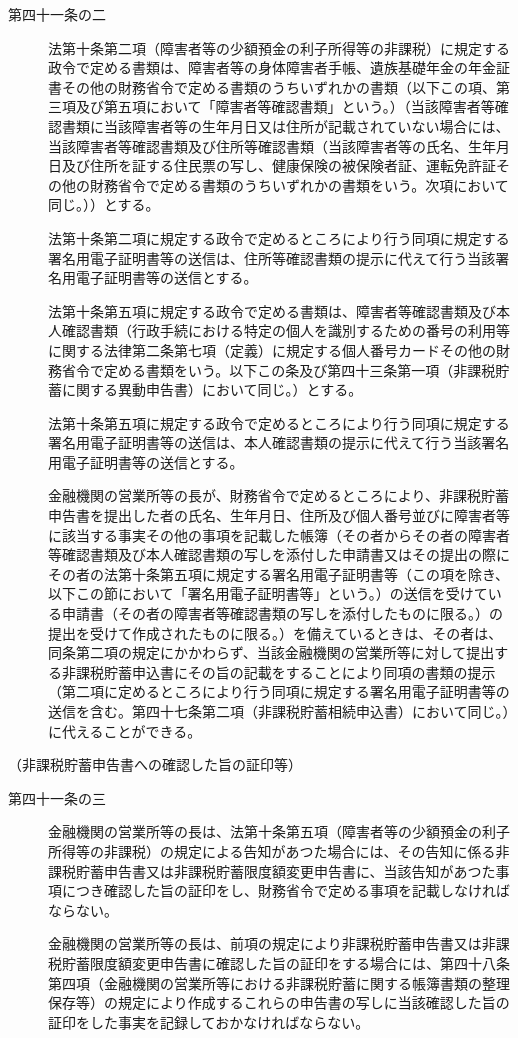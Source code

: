 \documentclass[twocolumn,a4j,10pt]{ltjtarticle}
\begin{document}
\begin{description}
\item[第四十一条の二]法第十条第二項（障害者等の少額預金の利子所得等の非課税）に規定する政令で定める書類は、障害者等の身体障害者手帳、遺族基礎年金の年金証書その他の財務省令で定める書類のうちいずれかの書類（以下この項、第三項及び第五項において「障害者等確認書類」という。）（当該障害者等確認書類に当該障害者等の生年月日又は住所が記載されていない場合には、当該障害者等確認書類及び住所等確認書類（当該障害者等の氏名、生年月日及び住所を証する住民票の写し、健康保険の被保険者証、運転免許証その他の財務省令で定める書類のうちいずれかの書類をいう。次項において同じ。））とする。
\item[]法第十条第二項に規定する政令で定めるところにより行う同項に規定する署名用電子証明書等の送信は、住所等確認書類の提示に代えて行う当該署名用電子証明書等の送信とする。
\item[]法第十条第五項に規定する政令で定める書類は、障害者等確認書類及び本人確認書類（行政手続における特定の個人を識別するための番号の利用等に関する法律第二条第七項（定義）に規定する個人番号カードその他の財務省令で定める書類をいう。以下この条及び第四十三条第一項（非課税貯蓄に関する異動申告書）において同じ。）とする。
\item[]法第十条第五項に規定する政令で定めるところにより行う同項に規定する署名用電子証明書等の送信は、本人確認書類の提示に代えて行う当該署名用電子証明書等の送信とする。
\item[]金融機関の営業所等の長が、財務省令で定めるところにより、非課税貯蓄申告書を提出した者の氏名、生年月日、住所及び個人番号並びに障害者等に該当する事実その他の事項を記載した帳簿（その者からその者の障害者等確認書類及び本人確認書類の写しを添付した申請書又はその提出の際にその者の法第十条第五項に規定する署名用電子証明書等（この項を除き、以下この節において「署名用電子証明書等」という。）の送信を受けている申請書（その者の障害者等確認書類の写しを添付したものに限る。）の提出を受けて作成されたものに限る。）を備えているときは、その者は、同条第二項の規定にかかわらず、当該金融機関の営業所等に対して提出する非課税貯蓄申込書にその旨の記載をすることにより同項の書類の提示（第二項に定めるところにより行う同項に規定する署名用電子証明書等の送信を含む。第四十七条第二項（非課税貯蓄相続申込書）において同じ。）に代えることができる。
\end{description}
\noindent\hspace{10pt}（非課税貯蓄申告書への確認した旨の証印等）
\begin{description}
\item[第四十一条の三]金融機関の営業所等の長は、法第十条第五項（障害者等の少額預金の利子所得等の非課税）の規定による告知があつた場合には、その告知に係る非課税貯蓄申告書又は非課税貯蓄限度額変更申告書に、当該告知があつた事項につき確認した旨の証印をし、財務省令で定める事項を記載しなければならない。
\item[]金融機関の営業所等の長は、前項の規定により非課税貯蓄申告書又は非課税貯蓄限度額変更申告書に確認した旨の証印をする場合には、第四十八条第四項（金融機関の営業所等における非課税貯蓄に関する帳簿書類の整理保存等）の規定により作成するこれらの申告書の写しに当該確認した旨の証印をした事実を記録しておかなければならない。
\end{description}
\end{document}
